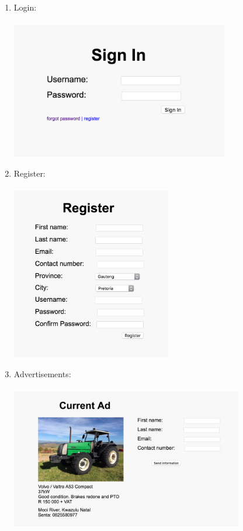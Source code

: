 \documentclass[11pt]{article}
\begin{document}
\begin{enumerate}
		\item Login: \\ \\
			\includegraphics[width=0.75\textwidth]{../Images/Pages/Login} \newpage
		\item Register: \\ \\
			\includegraphics[width=0.55\textwidth]{../Images/Pages/Register}
		\item Advertisements: \\ \\
		\includegraphics[width=0.8\textwidth]{../Images/Pages/ViewAds} \newpage

\end{enumerate}
\end{document}
